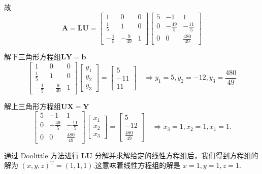 \begin{tcolorbox}
故
$$
\boldsymbol{A}=\boldsymbol{L} \boldsymbol{U}= \left[\begin{array}{ccc}1 & 0 & 0 \\ \frac{1}{5} & 1 & 0 \\ -\frac{1}{5} & -\frac{9}{49} & 1\end{array}\right]\left[\begin{array}{ccc}5 & -1 & 1 \\ 0 & -\frac{49}{5} & -\frac{11}{5} \\ 0 & 0 & \frac{480}{49}\end{array}\right]
$$

解下三角形方程组$\boldsymbol{LY=b}$
$$
\left[\begin{array}{ccc}1 & 0 & 0 \\ \frac{1}{5} & 1 & 0 \\ -\frac{1}{5} & -\frac{9}{49} & 1\end{array}\right]\left[\begin{array}{l}
y_{1} \\
y_{2} \\
y_{3}
\end{array}\right]=\left[\begin{array}{l}
5 \\
-11 \\
11
\end{array}\right] \quad \Longrightarrow
y_{1}=5, y_{2}=-12, y_{3}=\dfrac{480}{49}
$$

解上三角形方程组$\boldsymbol{UX=Y}$
$$
\left[\begin{array}{ccc}5 & -1 & 1 \\ 0 & -\frac{49}{5} & -\frac{11}{5} \\ 0 & 0 & \frac{480}{49}\end{array}\right]\left[\begin{array}{l}
x_{1} \\
x_{2} \\
x_{3}
\end{array}\right]=\left[\begin{array}{c}
5 \\
-12 \\
\frac{480}{49}
\end{array}\right]\quad \Longrightarrow x_3=1, x_2=1, x_1=1.
$$

通过 Doolittle 方法进行 $\boldsymbol{LU}$ 分解并求解给定的线性方程组后，我们得到方程组的解为 $(x, y, z)^\mathrm{T} = (1, 1, 1)$.这意味着线性方程组的解是 $x=1, y=1, z=1$.
\end{tcolorbox}

